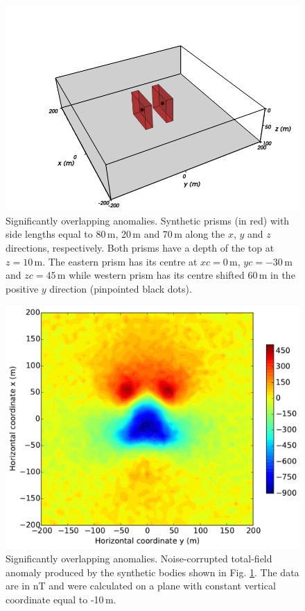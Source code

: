 \documentclass[journal abbreviation, npg]{copernicus}
\begin{document}
\begin{figure}[t]
\includegraphics[width=120mm]{Figures/npgd-2014-0069-f08}
\caption{Significantly overlapping anomalies. Synthetic prisms
(in red) with side lengths
equal to 80\,\unit{m}, 20\,\unit{m} and 70\,\unit{m} along
the $x$, $y$ and $z$ directions, respectively. Both prisms have a depth
of the top at $z = 10$\,\unit{m}. The eastern prism has its centre at 
$xc = 0$\,\unit{m}, $yc = -30$\,\unit{m} and $zc = 45$\,\unit{m} while
western prism has its centre shifted 60\,\unit{m} in the positive $y$ 
direction (pinpointed black dots).}
\label{fig:overlapping-prisms}
\end{figure}


\begin{figure}[t]
\includegraphics[width=120mm]{Figures/npgd-2014-0069-f09}
\caption{Significantly overlapping anomalies. Noise-corrupted 
total-field anomaly produced by the synthetic bodies shown in 
Fig. \ref{fig:overlapping-prisms}. The data are in nT and were
calculated on a plane with constant vertical coordinate equal to
-10\,\unit{m}.}
\label{fig:overlapping-prisms-data}
\end{figure}
\end{document}
